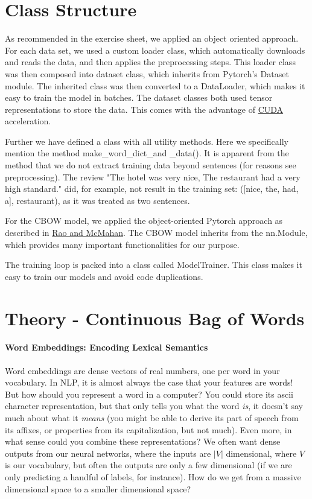 \documentclass[fleqn,10pt]{SelfArx} %
\begin{document}
\section{Class Structure}
As recommended in the exercise sheet, we applied an object oriented approach. For each data set, we used a custom loader class, which automatically downloads and reads the data, and then applies the preprocessing steps. This loader class was then composed into dataset class, which inherits from Pytorch's Dataset module. The inherited class was then converted to a DataLoader, which makes it easy to train the model in batches. The dataset classes both used tensor representations to store the data. This comes with the advantage of \href{https://de.wikipedia.org/wiki/CUDA}{CUDA} acceleration.

Further we have defined a class with all utility methods. Here we specifically mention the method make\_word\_dict\_and \_data(). It is apparent from the method that we do not extract training data beyond sentences (for reasons see preprocessing). The review "The hotel was very nice, The restaurant had a very high standard." did, for example, not result in the training set:  ([nice, the, had, a], restaurant), as it was treated as two sentences.

For the CBOW model, we applied the object-oriented Pytorch approach as described in \href{https://b-ok.global/book/3711505/debacd}{Rao and McMahan}. The CBOW model inherits from the nn.Module, which provides many important functionalities for our purpose.

The training loop is packed into a class called ModelTrainer. This class makes it easy to train our models and avoid code duplications. 

\section{Theory - Continuous Bag of Words}

\paragraph{Word Embeddings: Encoding Lexical Semantics}

Word embeddings are dense vectors of real numbers, one per word in your vocabulary. In NLP, it is almost always the case that your features are words! But how should you represent a word in a computer? You could store its ascii character representation, but that only tells you what the word \textit{is}, it doesn't say much about what it \textit{means} (you might be able to derive its part of speech from its affixes, or properties from
its capitalization, but not much). Even more, in what sense could you combine these representations? We often want dense outputs from our neural networks, where the inputs are $|V|$ dimensional, where $V$ is our vocabulary, but often the outputs are only a few dimensional (if we are only predicting a handful of labels, for instance). How do we get from a massive dimensional space to a smaller dimensional space?
\end{document}
